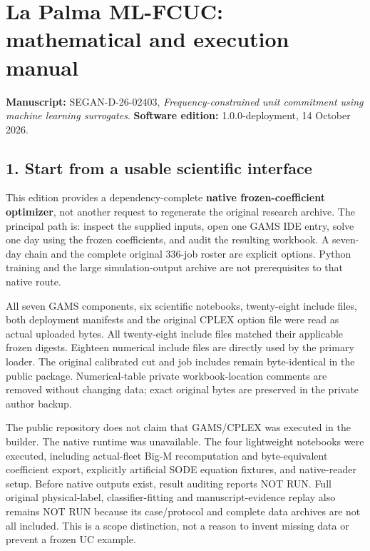 \documentclass[
  11pt,
  a4paper,
]{article}
\author{}
\date{}
\begin{document}
{
\setcounter{tocdepth}{2}
\tableofcontents
}
\section{La Palma ML-FCUC: mathematical and execution
manual}\label{la-palma-ml-fcuc-mathematical-and-execution-manual}

\textbf{Manuscript:} SEGAN-D-26-02403, \emph{Frequency-constrained unit
commitment using machine learning surrogates}. \textbf{Software
edition:} 1.0.0-deployment, 14 October 2026.

\subsection{1. Start from a usable scientific
interface}\label{start-from-a-usable-scientific-interface}

This edition provides a dependency-complete \textbf{native
frozen-coefficient optimizer}, not another request to regenerate the
original research archive. The principal path is: inspect the supplied
inputs, open one GAMS IDE entry, solve one day using the frozen
coefficients, and audit the resulting workbook. A seven-day chain and
the complete original 336-job roster are explicit options. Python
training and the large simulation-output archive are not prerequisites
to that native route.

All seven GAMS components, six scientific notebooks, twenty-eight
include files, both deployment manifests and the original CPLEX option
file were read as actual uploaded bytes. All twenty-eight include files
matched their applicable frozen digests. Eighteen numerical include
files are directly used by the primary loader. The original calibrated
cut and job includes remain byte-identical in the public package.
Numerical-table private workbook-location comments are removed without
changing data; exact original bytes are preserved in the private author
backup.

The public repository does not claim that GAMS/CPLEX was executed in the
builder. The native runtime was unavailable. The four lightweight
notebooks were executed, including actual-fleet Big-M recomputation and
byte-equivalent coefficient export, explicitly artificial SODE equation
fixtures, and native-reader setup. Before native outputs exist, result
auditing reports NOT RUN. Full original physical-label,
classifier-fitting and manuscript-evidence replay also remains NOT RUN
because its case/protocol and complete data archives are not all
included. This is a scope distinction, not a reason to invent missing
data or prevent a frozen UC example.
\end{document}
